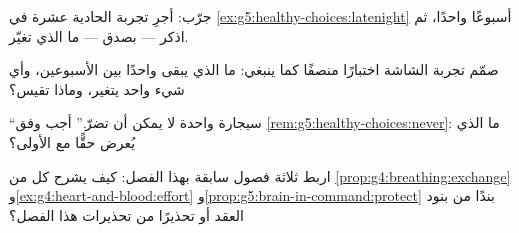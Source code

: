 \begin{exercise}[$\star$]\label{exo:g5:healthy-choices:8}
جرّب: أجرِ تجربة الحادية عشرة في
\cref{ex:g5:healthy-choices:latenight} أسبوعًا واحدًا، ثم اذكر ---
بصدق --- ما الذي تغيّر.
\end{exercise}

\begin{exercise}[$\star\star$]\label{exo:g5:healthy-choices:9}
صمّم تجربة الشاشة اختبارًا منصفًا كما ينبغي: ما الذي يبقى واحدًا
بين الأسبوعين، وأي شيء واحد يتغير، وماذا تقيس؟
\end{exercise}

\begin{exercise}[$\star\star$]\label{exo:g5:healthy-choices:10}
``سيجارة واحدة لا يمكن أن تضرّ.'' أجب وفق
\cref{rem:g5:healthy-choices:never}: ما الذي يُعرض حقًّا مع
الأولى؟
\end{exercise}

\begin{exercise}[$\star\star\star$]\label{exo:g5:healthy-choices:11}
اربط ثلاثة فصول سابقة بهذا الفصل: كيف يشرح كل من
\cref{prop:g4:breathing:exchange}
و\cref{ex:g4:heart-and-blood:effort}
و\cref{prop:g5:brain-in-command:protect} بندًا من بنود العقد أو
تحذيرًا من تحذيرات هذا الفصل؟
\end{exercise}
